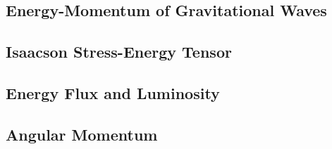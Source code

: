 \subsection{Energy-Momentum of Gravitational Waves}\label{subsec:energy-momentum-of-gravitational-waves}
\subsection{Isaacson Stress-Energy Tensor}\label{subsec:isaacson-stress-energy-tensor}
\subsection{Energy Flux and Luminosity}\label{subsec:energy-flux-and-luminosity}
\subsection{Angular Momentum}\label{subsec:angular-momentum}